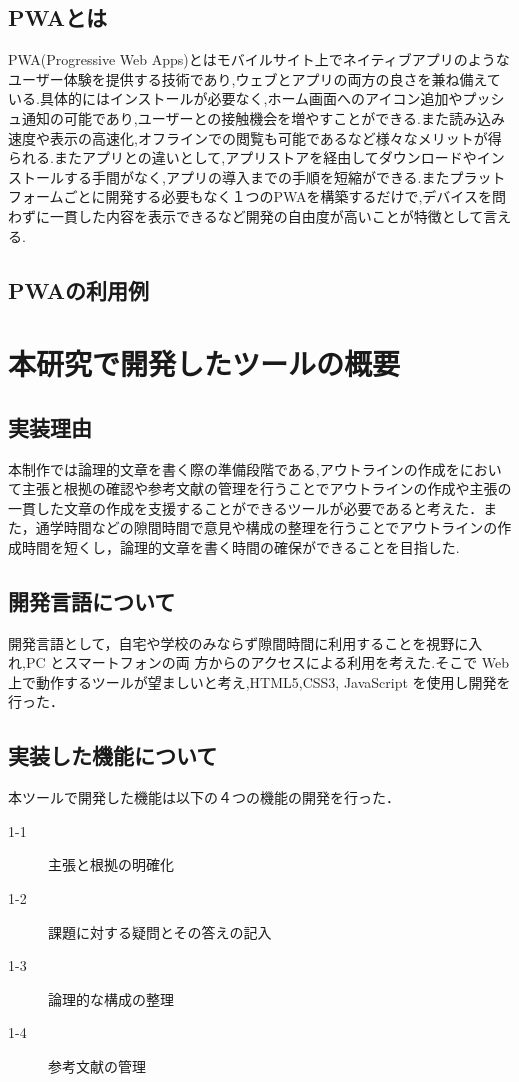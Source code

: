 \documentclass[a4j,12pt]{jarticle}
\begin{document}
\subsection{PWAとは}
PWA(Progressive Web Apps)とはモバイルサイト上でネイティブアプリのようなユーザー体験を提供する技術であり,ウェブとアプリの両方の良さを兼ね備えている.具体的にはインストールが必要なく,ホーム画面へのアイコン追加やプッシュ通知の可能であり,ユーザーとの接触機会を増やすことができる.また読み込み速度や表示の高速化,オフラインでの閲覧も可能であるなど様々なメリットが得られる.またアプリとの違いとして,アプリストアを経由してダウンロードやインストールする手間がなく,アプリの導入までの手順を短縮ができる.またプラットフォームごとに開発する必要もなく１つのPWAを構築するだけで,デバイスを問わずに一貫した内容を表示できるなど開発の自由度が高いことが特徴として言える\cite{ren6}.

\subsection{PWAの利用例}

\newpage
\section{本研究で開発したツールの概要}
\subsection{実装理由}
本制作では論理的文章を書く際の準備段階である,アウトラインの作成をにおいて主張と根拠の確認や参考文献の管理を行うことでアウトラインの作成や主張の一貫した文章の作成を支援することができるツールが必要であると考えた．また，通学時間などの隙間時間で意見や構成の整理を行うことでアウトラインの作成時間を短くし，論理的文章を書く時間の確保ができることを目指した.

\subsection{開発言語について}
開発言語として，自宅や学校のみならず隙間時間に利用することを視野に入れ,PC とスマートフォンの両
方からのアクセスによる利用を考えた.そこで Web 上で動作するツールが望ましいと考え,HTML5,CSS3, JavaScript を使用し開発を行った．
\subsection{実装した機能について}
本ツールで開発した機能は以下の４つの機能の開発を行った．
\begin{description}
  \item[1-1] 主張と根拠の明確化
  \item[1-2] 課題に対する疑問とその答えの記入
  \item[1-3] 論理的な構成の整理
  \item[1-4] 参考文献の管理
 \end{description}
\end{document}
